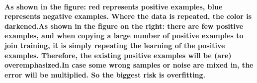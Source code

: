 \documentclass{article}
\begin{document}
\paragraph{As shown in the figure: red represents positive examples, blue represents negative examples. Where the data is repeated, the color is darkened.As shown in the figure on the right: there are few positive examples, and when copying a large number of positive examples to join training, it is simply repeating the learning of the positive examples. Therefore, the existing positive examples will be (are) overemphasized.In case some wrong samples or noise are mixed in, the error will be multiplied. So the biggest risk is overfitting.}















\end{document}

